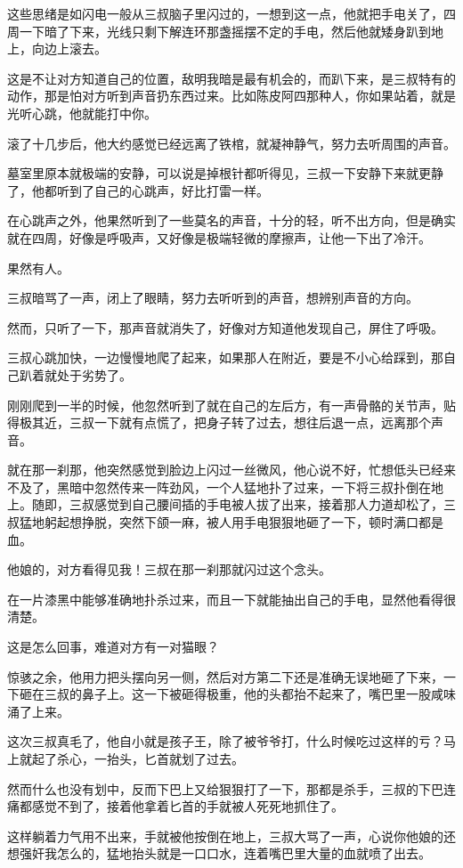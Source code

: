 这些思绪是如闪电一般从三叔脑子里闪过的，一想到这一点，他就把手电关了，四周一下暗了下来，光线只剩下解连环那盏摇摆不定的手电，然后他就矮身趴到地上，向边上滚去。

这是不让对方知道自己的位置，敌明我暗是最有机会的，而趴下来，是三叔特有的动作，那是怕对方听到声音扔东西过来。比如陈皮阿四那种人，你如果站着，就是光听心跳，他就能打中你。

滚了十几步后，他大约感觉已经远离了铁棺，就凝神静气，努力去听周围的声音。

墓室里原本就极端的安静，可以说是掉根针都听得见，三叔一下安静下来就更静了，他都听到了自己的心跳声，好比打雷一样。

在心跳声之外，他果然听到了一些莫名的声音，十分的轻，听不出方向，但是确实就在四周，好像是呼吸声，又好像是极端轻微的摩擦声，让他一下出了冷汗。

果然有人。

三叔暗骂了一声，闭上了眼睛，努力去听听到的声音，想辨别声音的方向。

然而，只听了一下，那声音就消失了，好像对方知道他发现自己，屏住了呼吸。

三叔心跳加快，一边慢慢地爬了起来，如果那人在附近，要是不小心给踩到，那自己趴着就处于劣势了。

刚刚爬到一半的时候，他忽然听到了就在自己的左后方，有一声骨骼的关节声，贴得极其近，三叔一下就有点慌了，把身子转了过去，想往后退一点，远离那个声音。

就在那一刹那，他突然感觉到脸边上闪过一丝微风，他心说不好，忙想低头已经来不及了，黑暗中忽然传来一阵劲风，一个人猛地扑了过来，一下将三叔扑倒在地上。随即，三叔感觉到自己腰间插的手电被人拔了出来，接着那人力道却松了，三叔猛地躬起想挣脱，突然下颌一麻，被人用手电狠狠地砸了一下，顿时满口都是血。

他娘的，对方看得见我！三叔在那一刹那就闪过这个念头。

在一片漆黑中能够准确地扑杀过来，而且一下就能抽出自己的手电，显然他看得很清楚。

这是怎么回事，难道对方有一对猫眼？

惊骇之余，他用力把头摆向另一侧，然后对方第二下还是准确无误地砸了下来，一下砸在三叔的鼻子上。这一下被砸得极重，他的头都抬不起来了，嘴巴里一股咸味涌了上来。

这次三叔真毛了，他自小就是孩子王，除了被爷爷打，什么时候吃过这样的亏？马上就起了杀心，一抬头，匕首就划了过去。

然而什么也没有划中，反而下巴上又给狠狠打了一下，那都是杀手，三叔的下巴连痛都感觉不到了，接着他拿着匕首的手就被人死死地抓住了。

这样躺着力气用不出来，手就被他按倒在地上，三叔大骂了一声，心说你他娘的还想强奸我怎么的，猛地抬头就是一口口水，连着嘴巴里大量的血就喷了出去。

